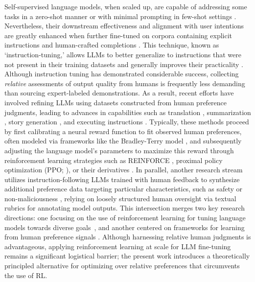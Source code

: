 Self-supervised language models, when scaled up, are capable of addressing some tasks in a zero-shot manner \citep{radford2019language} or with minimal prompting in few-shot settings \citep{gpt3,megatron,chowdhery2022palm}. Nevertheless, their downstream effectiveness and alignment with user intentions are greatly enhanced when further fine-tuned on corpora containing explicit instructions and human-crafted completions \citep{mishra-etal-2022-cross,sanh2022multitask,chung2022scaling,thoppilan2022lamda}. This technique, known as `instruction-tuning,' allows LLMs to better generalize to instructions that were not present in their training datasets and generally improves their practicality \citep{chung2022scaling}. Although instruction tuning has demonstrated considerable success, collecting \textit{relative} assessments of output quality from humans is frequently less demanding than sourcing expert-labeled demonstrations. As a result, recent efforts have involved refining LLMs using datasets constructed from human preference judgments, leading to advances in capabilities such as translation \citep{kreutzer-etal-2018-reliability}, summarization \citep{stiennon2022learning,ziegler2020finetuning}, story generation \citep{ziegler2020finetuning}, and executing instructions \citep{ouyang2022training,ramamurthy2023is}. Typically, these methods proceed by first calibrating a neural reward function to fit observed human preferences, often modeled via frameworks like the Bradley-Terry model \citep{bradley1952rankanalysis}, and subsequently adjusting the language model’s parameters to maximize this reward through reinforcement learning strategies such as REINFORCE \citep{williams1992reinforce}, proximal policy optimization (PPO; \cite{schulman2017proximal}), or their derivatives \citep{ramamurthy2023is}. In parallel, another research stream utilizes instruction-following LLMs trained with human feedback to synthesize additional preference data targeting particular characteristics, such as safety or non-maliciousness \citep{bai2022constitutional}, relying on loosely structured human oversight via textual rubrics for annotating model outputs. This intersection merges two key research directions: one focusing on the use of reinforcement learning for tuning language models towards diverse goals~\citep{Ranzato2015SequenceLT,paulus2018a,wu2018learning}, and another centered on frameworks for learning from human preference signals \citep{christiano2017deep,kupcsik2018learning}. Although harnessing relative human judgments is advantageous, applying reinforcement learning at scale for LLM fine-tuning remains a significant logistical barrier; the present work introduces a theoretically principled alternative for optimizing over relative preferences that circumvents the use of RL.

